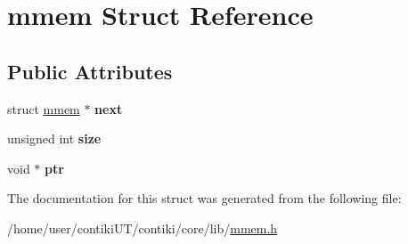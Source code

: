 \hypertarget{structmmem}{}\section{mmem Struct Reference}
\label{structmmem}
\subsection*{Public Attributes}
\begin{DoxyCompactItemize}
\item 
\hypertarget{structmmem_abda302bdbb3f92af119d500d886b9b31}{}struct \hyperlink{structmmem}{mmem} $\ast$ {\bfseries next}\label{structmmem_abda302bdbb3f92af119d500d886b9b31}

\item 
\hypertarget{structmmem_ae9a47b8845acb3840895d29be7008c2d}{}unsigned int {\bfseries size}\label{structmmem_ae9a47b8845acb3840895d29be7008c2d}

\item 
\hypertarget{structmmem_ae2406e94a73863053d46cf996a8b0346}{}void $\ast$ {\bfseries ptr}\label{structmmem_ae2406e94a73863053d46cf996a8b0346}

\end{DoxyCompactItemize}


The documentation for this struct was generated from the following file\+:\begin{DoxyCompactItemize}
\item 
/home/user/contiki\+U\+T/contiki/core/lib/\hyperlink{mmem_8h}{mmem.\+h}\end{DoxyCompactItemize}

